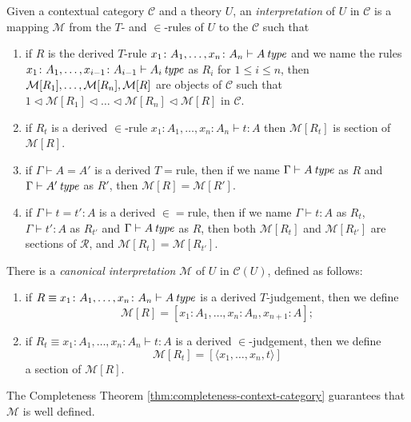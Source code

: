 \begin{definition}
    Given a contextual category $\mathcal{C}$ and a theory $U$, an \textit{interpretation} of $U$ in $\mathcal{C}$
    is a mapping $\mathcal{M}$ from the $T$- and $\in$-rules of $U$ to the $\mathcal{C}$ such that
    \begin{enumerate}
        \item if $R$ is the derived $T$-rule \(
                x_1 \colon A_1, \dots, x_n \colon A_n
                \vdash
                A \operatorname{\mathit{\space type}}    
            \) and we name the rules 
            \(
                x_1 \colon A_1, \dots, x_{i-1} \colon A_{i-1}
                \vdash 
                A_i \operatorname{\mathit{\space type}}
            \) as $R_i$ for $1 \leq i \leq n$, then $\mathcal{M}[R_1], \dots, \mathcal{M}[R_n], \\ \mathcal{M}[R]$ are
            objects of $\mathcal{C}$ such that \(
                1 \lhd \mathcal{M}[R_1] \lhd \dots \lhd \mathcal{M}[R_n] \lhd \mathcal{M}[R]
            \)
            in $\mathcal{C}$.

        \item if $R_t$ is a derived $\in$-rule \(
                x_1 \colon A_1, \dots, x_n \colon A_n   
                \vdash
                t \colon A
            \) then $\mathcal{M}[R_t]$ is section of $\mathcal{M}[R]$.

        \item if $\Gamma \vdash A = A'$ is a derived $T{=}$rule, then if we name 
                $\Gamma \vdash A \operatorname{\mathit{\space type}}$ as $R$
                and
                $\Gamma \vdash A' \operatorname{\mathit{\space type}}$ as $R'$,
            then $\mathcal{M}[R] = \mathcal{M}[R']$.
        \item if $\Gamma \vdash t = t' \colon A$ is a derived $\in=$rule, then if we name
                $\Gamma \vdash t \colon A$ as $R_t$,
                $\Gamma \vdash t' \colon A$ as $R_{t'}$ and
                $\Gamma \vdash A \operatorname{\mathit{\space type}}$ as $R$,
            then both $\mathcal{M}[R_t]$ and $\mathcal{M}[R_{t'}]$ are sections of $\mathcal{R}$,
            and $\mathcal{M}[R_t] = \mathcal{M}[R_{t'}]$.
    \end{enumerate}
\end{definition}

There is a \textit{canonical interpretation} $\mathcal{M}$ of $U$ in $\mathcal{C}(U)$, defined as follows:
\begin{enumerate}
    \item if $R \equiv x_1 \colon A_1, \dots, x_n \colon A_n \vdash A \operatorname{\mathit{\space type}}$ is a derived $T$-judgement, 
            then we define \[
                \mathcal{M}[R] = [x_1 \colon A_1, \dots, x_n \colon A_n, x_{n+1} \colon A];
            \]
    \item if $R_t \equiv x_1 \colon A_1, \dots, x_n \colon A_n \vdash t \colon A$ is a derived $\in$-judgement,
            then we define \[
                \mathcal{M}[R_t] = [\langle x_1, \dots, x_n, t \rangle]
            \] a section of $\mathcal{M}[R]$.
\end{enumerate}
The Completeness Theorem \ref{thm:completeness-context-category} guarantees that $\mathcal{M}$ is well defined.


